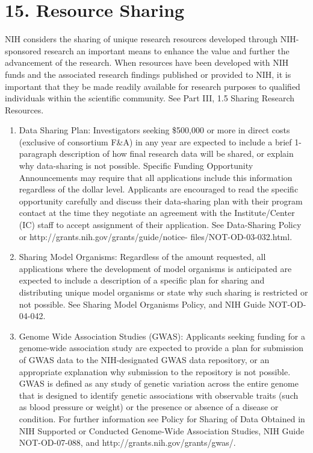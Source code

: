 \documentclass[11pt, notitlepage]{article} %
\begin{document}

\newpage

\section*{15. Resource Sharing}

NIH considers the sharing of unique research resources developed through NIH-sponsored research an important means to enhance the value and further the advancement of the research. When resources have been developed with NIH funds and the associated research findings published or provided to NIH, it is important that they be made readily available for research purposes to qualified individuals within the scientific community. See Part III, 1.5 Sharing Research Resources.

\begin{enumerate}
	\item{Data Sharing Plan:} Investigators seeking \$500,000 or more in direct costs (exclusive of consortium F\&A) in any year are expected to include a brief 1-paragraph description of how final research data will be shared, or explain why data-sharing is not possible. Specific Funding Opportunity Announcements may require that all applications include this information regardless of the dollar level. Applicants are encouraged to read the specific opportunity carefully and discuss their data-sharing plan with their program contact at the time they negotiate an agreement with the Institute/Center (IC) staff to accept assignment of their application. See Data-Sharing Policy or http://grants.nih.gov/grants/guide/notice- files/NOT-OD-03-032.html.
	\item{Sharing Model Organisms:} Regardless of the amount requested, all applications where the development of model organisms is anticipated are expected to include a description of a specific plan for sharing and distributing unique model organisms or state why such sharing is restricted or not possible. See Sharing Model Organisms Policy, and NIH Guide NOT-OD-04-042.
	\item{Genome Wide Association Studies (GWAS):} Applicants seeking funding for a genome-wide association study are expected to provide a plan for submission of GWAS data to the NIH-designated GWAS data repository, or an appropriate explanation why submission to the repository is not possible. GWAS is defined as any study of genetic variation across the entire genome that is designed to identify genetic associations with observable traits (such as blood pressure or weight) or the presence or absence of a disease or condition. For further information see Policy for Sharing of Data Obtained in NIH Supported or Conducted Genome-Wide Association Studies, NIH Guide NOT-OD-07-088, and http://grants.nih.gov/grants/gwas/.
\end{enumerate}
\end{document}
